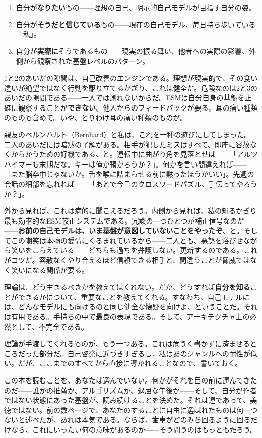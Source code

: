 \documentclass[11pt, twoside, openright]{book}
\begin{document}
\begin{enumerate}
  \item 自分が\textbf{なりたい}もの------理想の自己、明示的自己モデルが目指す自分の姿。
  \item 自分が\textbf{そうだと信じている}もの------現在の自己モデル、毎日持ち歩いている「私」。
  \item 自分が\textbf{実際に}そうであるもの------現実の振る舞い、他者への実際の影響、外側から観察された基盤レベルのパターン。
\end{enumerate}

1と2のあいだの隙間は、自己改善のエンジンである。理想が現実的で、その食い違いが絶望ではなく行動を駆り立てるかぎり、これは健全だ。危険なのは2と3のあいだの隙間である------一人では測れないからだ。ESMは自分自身の基盤を正確に観察することが\textbf{できない}。他人からのフィードバックが要る。耳の痛い種類のものも含めて。いや、とりわけ耳の痛い種類のものが。

親友のベルンハルト（Bernhard）と私は、これを一種の遊びにしてしまった。二人のあいだには暗黙の了解がある。相手が犯したミスはすべて、即座に容赦なくからかうための好機である、と。運転中に曲がり角を見落とせば------「アルツハイマーも末期だな。キーは俺が預かろうか？」。何かを言い間違えれば------「また脳卒中じゃないか。舌を喉に詰まらせる前に黙ったほうがいい」。先週の会話の細部を忘れれば------「あとで今日のクロスワードパズル、手伝ってやろうか？」。

外から見れば、これは病的に聞こえるだろう。内側から見れば、私の知るかぎり最も効率的なESM較正システムである。冗談の一つひとつが補正信号なのだ------\textbf{お前の自己モデルは、いま基盤が意図していないことをやったぞ}、と。そしてこの嘲笑は本物の愛情にくるまれているから------二人とも、悪態を浴びせながら笑いをこらえている------どちらも過ちを弁護しない。更新するのである。これがコツだ。容赦なくやり合えるほど信頼できる相手と、間違うことが脅威ではなく笑いになる関係が要る。

理論は、どう生きるべきかを教えてはくれない。だが、どうすれば\textbf{自分を知る}ことができるかについて、重要なことを教えてくれる。すなわち、自己モデルには、どんなモデルにも向けるのと同じ健全な懐疑を向けよ、ということだ。それは有用である。手持ちの中で最良の表現である。そして、アーキテクチャ上の必然として、不完全である。

理論が手渡してくれるものが、もう一つある。これは危うく書かずに済ませるところだった部分だ。自己啓発に近づきすぎるし、私はあのジャンルへの耐性が低い。だが、ここまでのすべてから直接に導かれることなので、書いておく。

この本を読むことを、あなたは選んでいない。何かがそれを目の前に運んできたのだ------誰かの推薦か、アルゴリズムか、退屈な午後か------そして、自分が作者ではない状態にあった基盤が、読み続けることを決めた。それは運であって、美徳ではない。前の数ページで、あなたのすることに自由に選ばれたものは何一つないと述べたが、あれは本気である。ならば、歯車がどのみち回るように回るだけなら、これにいったい何の意味があるのか------そう問うのはもっともだろう。
\end{document}
